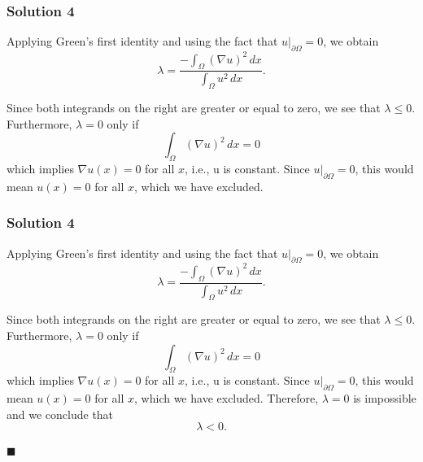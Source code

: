 \documentclass[10pt, t, allowdisplaybreaks]{beamer}
\newcommand{\myqed}{\hfill$\blacksquare$}
\newcommand{\at}[3]{\left.#1\right\vert_{#2}^{#3}}
\begin{document}
\begin{frame}
    \frametitle{Solution 4}
    \par Applying Green's first identity and using the fact that $\at{u}{\partial \Omega}{} = 0$, we obtain
    \begin{equation*}
        \lambda = \frac{-\int_\Omega (\nabla u)^2\,dx}{\int_\Omega u^2\,dx}.
    \end{equation*}

    \par Since both integrands on the right are greater or equal to zero, we see that $\lambda\leq 0$. Furthermore, $\lambda = 0$ only if 
    \begin{equation*}
        \int_\Omega(\nabla u)^2\,dx = 0
    \end{equation*}
    which implies $\nabla u(x) = 0$ for all $x$, i.e., u is constant. Since $\at{u}{\partial \Omega}{} = 0$, this would mean $u(x) = 0$ for all $x$, which we
    have excluded.
\end{frame}
\begin{frame}
    \frametitle{Solution 4}
    \par Applying Green's first identity and using the fact that $\at{u}{\partial \Omega}{} = 0$, we obtain
    \begin{equation*}
        \lambda = \frac{-\int_\Omega (\nabla u)^2\,dx}{\int_\Omega u^2\,dx}.
    \end{equation*}

    \par Since both integrands on the right are greater or equal to zero, we see that $\lambda\leq 0$. Furthermore, $\lambda = 0$ only if 
    \begin{equation*}
        \int_\Omega(\nabla u)^2\,dx = 0
    \end{equation*}
    which implies $\nabla u(x) = 0$ for all $x$, i.e., u is constant. Since $\at{u}{\partial \Omega}{} = 0$, this would mean $u(x) = 0$ for all $x$, which we
    have excluded. Therefore, $\lambda = 0$ is impossible and we conclude that
    \begin{equation*}
        \lambda < 0.
    \end{equation*}
    
    \myqed

\end{frame}
\end{document}

